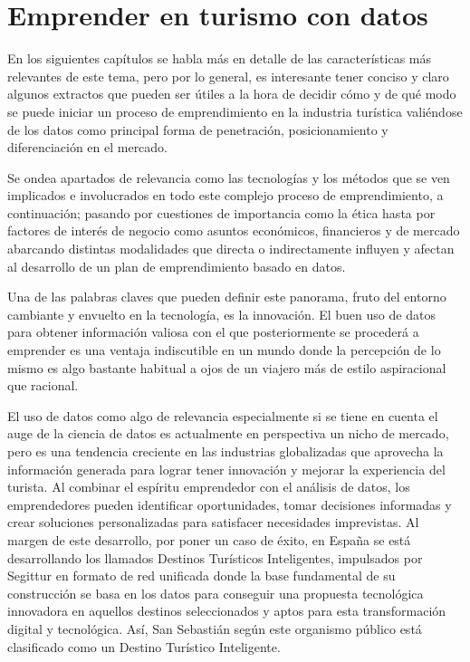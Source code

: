 \documentclass[
  letterpaper,
  DIV=11,
  numbers=noendperiod]{scrreprt}
\begin{document}
\hypertarget{emprender-en-turismo-con-datos}{%
\section{Emprender en turismo con
datos}\label{emprender-en-turismo-con-datos}}

En los siguientes capítulos se habla más en detalle de las
características más relevantes de este tema, pero por lo general, es
interesante tener conciso y claro algunos extractos que pueden ser
útiles a la hora de decidir cómo y de qué modo se puede iniciar un
proceso de emprendimiento en la industria turística valiéndose de los
datos como principal forma de penetración, posicionamiento y
diferenciación en el mercado.

Se ondea apartados de relevancia como las tecnologías y los métodos que
se ven implicados e involucrados en todo este complejo proceso de
emprendimiento, a continuación; pasando por cuestiones de importancia
como la ética hasta por factores de interés de negocio como asuntos
económicos, financieros y de mercado abarcando distintas modalidades que
directa o indirectamente influyen y afectan al desarrollo de un plan de
emprendimiento basado en datos.

Una de las palabras claves que pueden definir este panorama, fruto del
entorno cambiante y envuelto en la tecnología, es la innovación. El buen
uso de datos para obtener información valiosa con el que posteriormente
se procederá a emprender es una ventaja indiscutible en un mundo donde
la percepción de lo mismo es algo bastante habitual a ojos de un viajero
más de estilo aspiracional que racional.

El uso de datos como algo de relevancia especialmente si se tiene en
cuenta el auge de la ciencia de datos es actualmente en perspectiva un
nicho de mercado, pero es una tendencia creciente en las industrias
globalizadas que aprovecha la información generada para lograr tener
innovación y mejorar la experiencia del turista. Al combinar el espíritu
emprendedor con el análisis de datos, los emprendedores pueden
identificar oportunidades, tomar decisiones informadas y crear
soluciones personalizadas para satisfacer necesidades imprevistas. Al
margen de este desarrollo, por poner un caso de éxito, en España se está
desarrollando los llamados Destinos Turísticos Inteligentes, impulsados
por Segittur en formato de red unificada donde la base fundamental de su
construcción se basa en los datos para conseguir una propuesta
tecnológica innovadora en aquellos destinos seleccionados y aptos para
esta transformación digital y tecnológica. Así, San Sebastián según este
organismo público está clasificado como un Destino Turístico
Inteligente.
\end{document}
